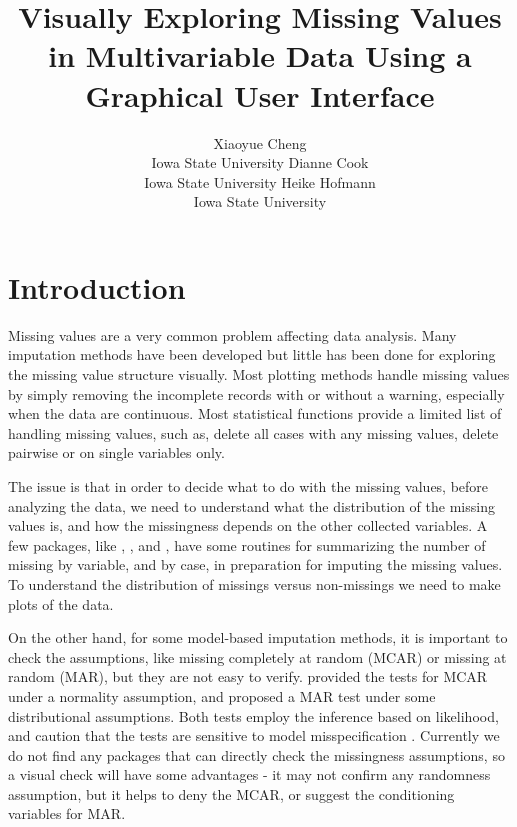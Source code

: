 \documentclass[article]{jss}
\author{Xiaoyue Cheng\\Iowa State University \And 
        Dianne Cook\\Iowa State University \And
        Heike Hofmann\\Iowa State University}
\title{Visually Exploring Missing Values in Multivariable Data 
       Using a Graphical User Interface}
\begin{document}
\section{Introduction}\label{introduction}

Missing values are a very common problem affecting data analysis. Many imputation methods have been developed but little has been done for exploring the missing value structure visually.  Most plotting methods handle missing values by simply removing the incomplete records with or without a warning, especially when the data are continuous. Most statistical functions provide a limited list of handling missing values, such as, delete all cases with any missing values, delete pairwise or on single variables only.

The issue is that in order to decide what to do with the missing values, before analyzing the data, we need to understand what the distribution of the missing values is, and how the missingness depends on the other collected variables. A few  packages, like  \citep{hmisc},  \citep{norm}, and  \citep{mice}, have some routines for summarizing the number of missing by variable, and by case, in preparation for imputing the missing values. To understand the distribution of missings versus non-missings we need to make plots of the data.

On the other hand, for some model-based imputation methods, it is important to check the assumptions, like missing completely at random (MCAR) or missing at random (MAR), but they are not easy to verify. \citet{little1988test} provided the tests for MCAR under a normality assumption, and \citet{jaeger2006testing} proposed a MAR test under some distributional assumptions. Both tests employ the inference based on likelihood, and caution that the tests are sensitive to model misspecification \citep{little1988test}. Currently we do not find any  packages that can directly check the missingness assumptions, so a visual check will have some advantages - it may not confirm any randomness assumption, but it helps to deny the MCAR, or suggest the conditioning variables for MAR.
\end{document}
